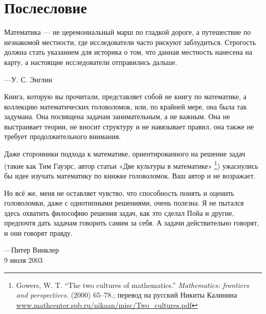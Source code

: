 \chapter*{Послесловие}

\setlength{\epigraphwidth}{.6\textwidth}
\epigraph{Математика --- не церемониальный марш по гладкой дороге, а путешествие по незнакомой местности, где исследователи часто рискуют заблудиться.
Строгость должна стать указанием для историка о том, что данная местность нанесена на карту, а настоящие исследователи отправились дальше.}{---У. С. Энглин
}

Книга, которую  вы прочитали, представляет собой не книгу по математике, а коллекцию математических головоломок, или, по крайней мере, она была так задумана.
Она посвящена задачам занимательным, а не важным.
Она не выстраивает теории, не вносит структуру и не навязывает правил, она также не требует продолжительного внимания.

Даже сторонники подхода к математике, ориентированного на решение задач (такие как Тим Гауэрс, автор статьи «Две культуры в математике»%
\footnote{Gowers, W. T. ``The two cultures of mathematics.'' \emph{Mathematics: frontiers and perspectives.} (2000) 65--78.; перевод на русский Никиты Калинина \href{http://www.mathcenter.spb.ru/nikaan/misc/Two_cultures.pdf}{\url{www.mathcenter.spb.ru/nikaan/misc/Two_cultures.pdf}}})
ужаснулись бы идее изучать математику по книжке головоломок.
Ваш автор и не возражает.

Но всё же, меня не оставляет чувство, что способность понять и оценить головоломки, даже с однотипными решениями, очень полезна.
Я не пытался здесь охватить  философию решения задач, как это сделал Пойа и другие, предпочтя дать задачам говорить самим за себя.
А задачи действительно говорят, и они говорят правду.

\begin{flushright}
---Питер Винклер
\\
9 июля 2003
\end{flushright}
